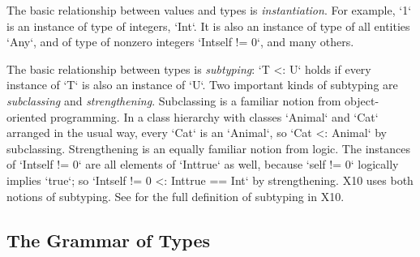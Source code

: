 The basic relationship between values and types is {\em instantiation}. For
example, \xcd`1` is an instance of type of integers, \xcd`Int`. It is also an
instance of type of all entities \xcd`Any`, and of type of nonzero integers
\xcd`Int{self != 0}`, and many others.

The basic relationship between types is {\em subtyping}: \xcd`T <: U` holds if
every instance of \xcd`T` is also an instance of \xcd`U`. Two important kinds
of subtyping are {\em subclassing} and {\em strengthening}.  Subclassing is a
familiar notion from object-oriented programming.  In a class
hierarchy with classes \xcd`Animal` and \xcd`Cat` arranged in the usual way,
every \xcd`Cat` is an \xcd`Animal`, so \xcd`Cat <: Animal` by subclassing.  
Strengthening is an equally familiar notion from logic.   The instances of
\xcd`Int{self != 0}` are all elements of \xcd`Int{true}` as well, because
\xcd`self != 0` logically implies \xcd`true`; so 
\xcd`Int{self != 0} <: Int{true} == Int` by strengthening.  X10 uses both
notions of subtyping.  See  for the full definition
of subtyping in X10.




\subsection*{The Grammar of Types}

